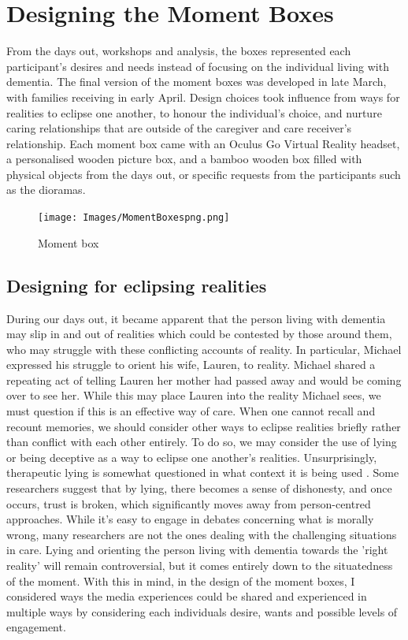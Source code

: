 \section{Designing the Moment Boxes}
\label{Relationships:MomentBoxes}
From the days out, workshops and analysis, the boxes represented each participant's desires and needs instead of focusing on the individual living with dementia. The final version of the moment boxes was developed in late March, with families receiving in early April. Design choices took influence from ways for realities to eclipse one another, to honour the individual's choice, and nurture caring relationships that are outside of the caregiver and care receiver's relationship. Each moment box came with an Oculus Go Virtual Reality headset, a personalised wooden picture box, and a bamboo wooden box filled with physical objects from the days out, or specific requests from the participants such as the dioramas.
 
\begin{figure}
\centering
\texttt{[image: Images/MomentBoxespng.png]}
\caption{Moment box}
\label{fig:MomentBoxes}
\end{figure}

 
\subsection{Designing for eclipsing realities}
\label{momentBoxes:realities}
During our days out, it became apparent that the person living with dementia may slip in and out of realities which could be contested by those around them, who may struggle with these conflicting accounts of reality. In particular, Michael expressed his struggle to orient his wife, Lauren, to reality. Michael shared a repeating act of telling Lauren her mother had passed away and would be coming over to see her. While this may place Lauren into the reality Michael sees, we must question if this is an effective way of care. When one cannot recall and recount memories, we should consider other ways to eclipse realities briefly rather than conflict with each other entirely. To do so, we may consider the use of lying or being deceptive as a way to eclipse one another's realities. Unsurprisingly, therapeutic lying is somewhat questioned in what context it is being used \citep{elvish_lying_2010, lorey_fake_2019}. Some researchers suggest that by lying, there becomes a sense of dishonesty, and once occurs, trust is broken, which significantly moves away from person-centred approaches. While it's easy to engage in debates concerning what is morally wrong, many researchers are not the ones dealing with the challenging situations in care. Lying and orienting the person living with dementia towards the 'right reality' will remain controversial, but it comes entirely down to the situatedness of the moment. With this in mind, in the design of the moment boxes, I considered ways the media experiences could be shared and experienced in multiple ways by considering each individuals desire, wants and possible levels of engagement.
 
